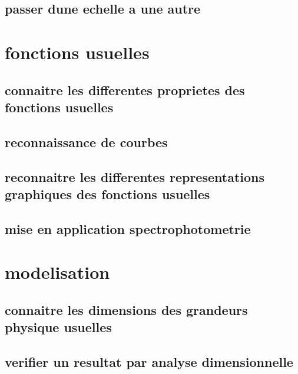 \documentclass[11pt]{article}
\begin{document}
    \subsection{passer dune echelle a une autre}
      
  \section{fonctions usuelles}
    \subsection{connaitre les differentes proprietes des fonctions usuelles}
      
    \subsection{reconnaissance de courbes}
      
    \subsection{reconnaitre les differentes representations graphiques des fonctions usuelles}
      
    \subsection{mise en application  spectrophotometrie}
      
  \section{modelisation}
    \subsection{connaitre les dimensions des grandeurs physique usuelles}
      
    \subsection{verifier un resultat par analyse dimensionnelle}
      
\end{document}
